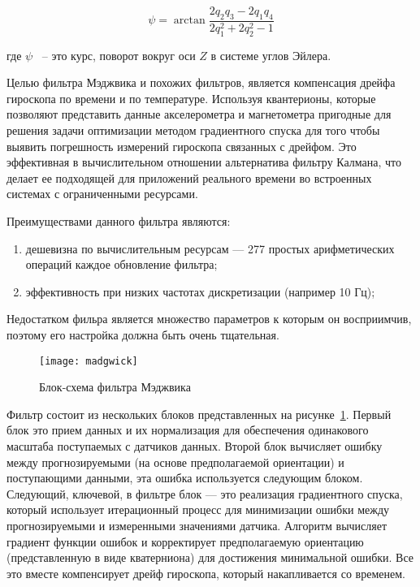 \begin{equation}
    \label{eq:domain:QtoPsi}
    \psi = \arctan{\frac{2q_{2}q_{3}-2q_{1}q_{4}}{2q_{1}^{2} + 2q_{2}^{2}-1}}
    \end{equation}
    \begin{explanationx}
        \item[где] $\psi$ ~-- это курс, поворот вокруг оси $Z$ в системе углов Эйлера.
        \end{explanationx}
        
Целью фильтра Мэджвика и похожих фильтров, является компенсация дрейфа гироскопа по времени и по температуре.
Используя квантерионы, которые позволяют представить данные акселерометра и магнетометра пригодные для решения задачи оптимизации 
методом градиентного спуска для того чтобы выявить погрешность измерений гироскопа связанных с дрейфом. Это эффективная в 
вычислительном отношении альтернатива фильтру Калмана, что делает ее подходящей для приложений реального времени во встроенных 
системах с ограниченными ресурсами. 

Преимуществами данного фильтра являются:

\begin{enumerate}
    \item дешевизна по вычислительным ресурсам — 277 простых арифметических операций каждое обновление фильтра;
    \item эффективность при низких частотах дискретизации (например 10 Гц);
\end{enumerate}

Недостатком фильра является множество параметров к которым он восприимчив, поэтому его настройка должна быть очень тщательная.


\begin{figure}[ht]
    \centering
    \texttt{[image: madgwick]}
    \caption{Блок-схема фильтра Мэджвика}
    \label{pic::domain::madgwick}
\end{figure}


Фильтр состоит из нескольких блоков представленных на рисунке~\ref{pic::domain::madgwick}.
Первый блок это прием данных и их нормализация для обеспечения одинакового 
масштаба поступаемых с датчиков данных.
Второй блок вычисляет ошибку между прогнозируемыми (на основе предполагаемой ориентации) и поступающими данными, 
эта ошибка используется следующим блоком.
Следующий, ключевой, в фильтре блок --- это реализация градиентного спуска, который 
использует итерационный процесс для минимизации ошибки между прогнозируемыми и 
измеренными значениями датчика. Алгоритм вычисляет градиент функции ошибок и корректирует
предполагаемую ориентацию (представленную в виде кватерниона) для достижения минимальной ошибки.
Все это вместе компенсирует дрейф гироскопа, который накапливается со временем.

